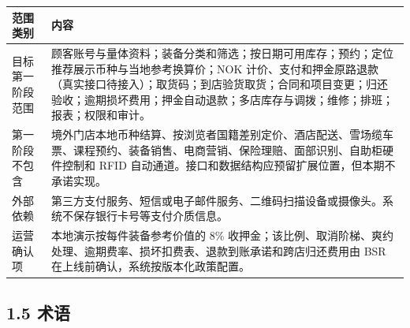 {\def\LTcaptype{none} %
\begin{longtable}[]{@{}
  >{\centering\arraybackslash}p{}
  >{\raggedright\arraybackslash}p{}@{}}
\toprule\noalign{}\rowcolor{TableHead}
\begin{minipage}[b]{\linewidth}\color{white}\bfseries\centering
\textbf{范围类别}
\end{minipage} & \begin{minipage}[b]{\linewidth}\color{white}\bfseries\centering
\textbf{内容}
\end{minipage} \\
\midrule\noalign{}
\endhead
\bottomrule\noalign{}
\endlastfoot
目标第一阶段范围 & 顾客账号与量体资料；装备分类和筛选；按日期可用库存；预约；定位推荐展示币种与当地参考换算价；NOK 计价、支付和押金原路退款（真实接口待接入）；取货码；到店验货取货；合同和项目变更；归还验收；逾期损坏费用；押金自动退款；多店库存与调拨；维修；排班；报表；权限和审计。 \\
第一阶段不包含 & 境外门店本地币种结算、按浏览者国籍差别定价、酒店配送、雪场缆车票、课程预约、装备销售、电商营销、保险理赔、面部识别、自助柜硬件控制和 RFID 自动通道。接口和数据结构应预留扩展位置，但本期不承诺实现。 \\
外部依赖 & 第三方支付服务、短信或电子邮件服务、二维码扫描设备或摄像头。系统不保存银行卡号等支付介质信息。 \\
运营确认项 & 本地演示按每件装备参考价值的 8\% 收押金；该比例、取消阶梯、爽约处理、逾期费率、损坏扣费表、退款到账承诺和跨店归还费用由 BSR 在上线前确认，系统按版本化政策配置。 \\
\end{longtable}
}



\subsection{1.5 术语}

